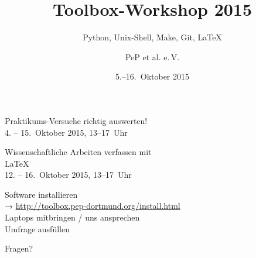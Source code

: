 

\title[Toolbox 2015]{Toolbox-Workshop 2015}
\subtitle{Python, Unix-Shell, Make, Git, \LaTeX{}}
\date{5.–16.~Oktober 2015}
\author{PeP et al. e.\,V.}



\maketitle

\begin{frame}
  \begin{center}
  \Large Praktikums-Versuche richtig auswerten!\\
  4. – 15.~Oktober 2015, 13–17~Uhr
  \end{center}
\end{frame}

\begin{frame}
  \begin{center}
    Wissenschaftliche Arbeiten verfassen mit \\[0.5\baselineskip]
    \textrm{\Huge\LaTeX{}}\\[0.5\baselineskip]
    12. – 16.~Oktober 2015, 13–17~Uhr
  \end{center}
\end{frame}

\begin{frame}
  \begin{center}
    \Large
    Software installieren\\[0.5\baselineskip]
    → \textcolor{blue!70!black}{\url{http://toolbox.pep-dortmund.org/install.html}}\\[0.5\baselineskip]
    Laptops mitbringen / uns ansprechen\\[0.5\baselineskip]
    Umfrage ausfüllen
  \end{center}
\end{frame}
\begin{frame}
  \Huge\centering
  \textcolor{red!70!black}{Fragen?}
\end{frame}


